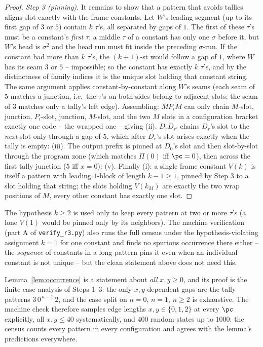 \begin{proof}
\emph{Step 3 (pinning).}  It remains to show that a pattern that
avoids tallies aligns slot-exactly with the frame constants.  Let
$W$'s leading segment (up to its first gap of $3$ or $5$) contain
$k$ $\tau$'s, all separated by gaps of $1$.  The first of these
$\tau$'s must be a constant's \emph{first} $\tau$: a middle $\tau$
of a constant has only one $\sigma$ before it, but $W$'s head is
$\sigma^2$ and the head run must fit inside the preceding
$\sigma$-run.  If the constant had more than $k$ $\tau$'s, the
$(k{+}1)$-st would follow a gap of $1$, where $W$ has its seam $3$
or $5$ -- impossible; so the constant has exactly $k$ $\tau$'s, and
by the distinctness of family indices it is the unique slot holding
that constant string.  The same argument applies constant-by-constant
along $W$'s seams (each seam of $5$ matches a junction, i.e.\ the
$\tau$'s on both sides belong to adjacent slots; the seam of $3$
matches only a tally's left edge).  Assembling: $M P_i M$ can only
chain $M$-slot, junction, $P_i$-slot, junction, $M$-slot, and the two
$M$ slots in a configuration bracket exactly one code -- the wrapped
one -- giving (ii).  $D_rD_{r'}$ chains $D_r$'s slot to the
\emph{next} slot only through a gap of $5$, which after $D_r$'s slot
arises exactly when the tally is empty: (iii).  The output prefix is
pinned at $D_0$'s slot and then slot-by-slot through the program
zone (which matches $\Pi(0)$ iff $\pc=0$), then across the first
tally junction ($5$ iff $x=0$): (v).  Finally (i): a single frame
constant $V(k)$ is itself a pattern with leading $1$-block of length
$k-1\ge 1$, pinned by Step 3 to a slot holding that string; the
slots holding $V(k_M)$ are exactly the two wrap positions of $M$,
every other constant has exactly one slot.
\end{proof}

\begin{remark}
The hypothesis $k\ge 2$ is used only to keep every pattern at two or
more $\tau$'s (a lone $V(1)$ would be pinned only by its neighbors).
The machine verification (part A of \texttt{verify\_r3.py}) also runs
the full census under the hypothesis-violating assignment $k=1$ for
one constant and finds no spurious occurrence there either -- the
\emph{sequence} of constants in a long pattern pins it even when an
individual constant is not unique -- but the clean statement above
does not need this.
\end{remark}

\begin{remark}
Lemma~\ref{lem:occurrence} is a statement about \emph{all}
$x,y\ge 0$, and its proof is the finite case analysis of Steps 1--3:
the only $x,y$-dependent gaps are the tally patterns
$3\,0^{\,n-1}\,2$, and the case split on $n=0$, $n=1$, $n\ge 2$ is
exhaustive.  The machine check therefore samples edge lengths
$x,y\in\{0,1,2\}$ at every $\pc$ explicitly, all $x,y\le 40$
systematically, and $400$ random states up to $1000$: the census
counts every pattern in every configuration and agrees with the
lemma's predictions everywhere.
\end{remark}
